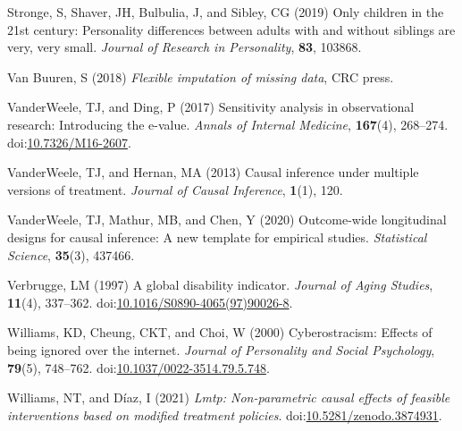 \documentclass[
  single column]{article}
\newlength{\cslhangindent}
\newenvironment{CSLReferences}[2] %
 {\begin{list}{}{%
  \setlength{\itemindent}{0pt}
  \setlength{\leftmargin}{0pt}
  \setlength{\parsep}{0pt}
  \ifodd #1
   \setlength{\leftmargin}{\cslhangindent}
   \setlength{\itemindent}{-1\cslhangindent}
  \fi
  \setlength{\itemsep}{#2\baselineskip}}}
 {\end{list}}
\begin{document}
\begin{CSLReferences}{1}{0}
Stronge, S, Shaver, JH, Bulbulia, J, and Sibley, CG (2019) Only children
in the 21st century: Personality differences between adults with and
without siblings are very, very small. \emph{Journal of Research in
Personality}, \textbf{83}, 103868.

Van Buuren, S (2018) \emph{Flexible imputation of missing data}, CRC
press.

VanderWeele, TJ, and Ding, P (2017) Sensitivity analysis in
observational research: Introducing the e-value. \emph{Annals of
Internal Medicine}, \textbf{167}(4), 268--274.
doi:\href{https://doi.org/10.7326/M16-2607}{10.7326/M16-2607}.

VanderWeele, TJ, and Hernan, MA (2013) Causal inference under multiple
versions of treatment. \emph{Journal of Causal Inference},
\textbf{1}(1), 120.

VanderWeele, TJ, Mathur, MB, and Chen, Y (2020) Outcome-wide
longitudinal designs for causal inference: A new template for empirical
studies. \emph{Statistical Science}, \textbf{35}(3), 437466.

Verbrugge, LM (1997) A global disability indicator. \emph{Journal of
Aging Studies}, \textbf{11}(4), 337--362.
doi:\href{https://doi.org/10.1016/S0890-4065(97)90026-8}{10.1016/S0890-4065(97)90026-8}.

Williams, KD, Cheung, CKT, and Choi, W (2000) Cyberostracism: Effects of
being ignored over the internet. \emph{Journal of Personality and Social
Psychology}, \textbf{79}(5), 748--762.
doi:\href{https://doi.org/10.1037/0022-3514.79.5.748}{10.1037/0022-3514.79.5.748}.

Williams, NT, and Díaz, I (2021) \emph{Lmtp: Non-parametric causal
effects of feasible interventions based on modified treatment policies}.
doi:\href{https://doi.org/10.5281/zenodo.3874931}{10.5281/zenodo.3874931}.

\end{CSLReferences}
\end{document}
